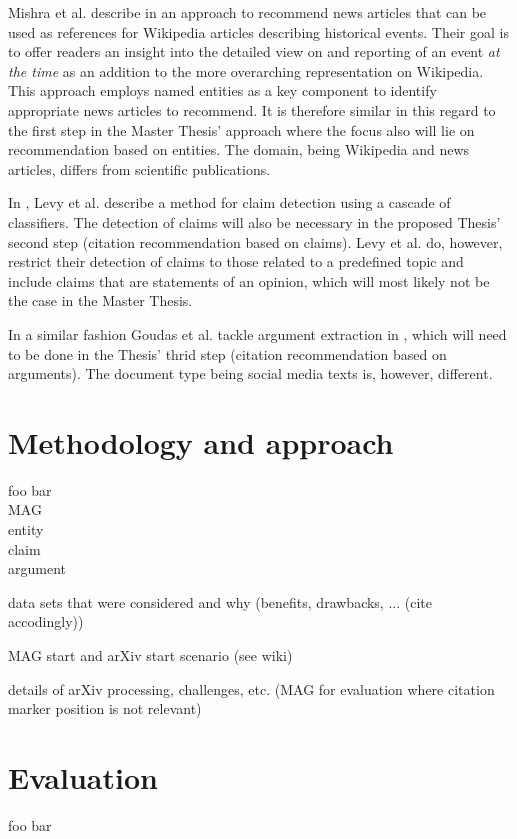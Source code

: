 \documentclass{proseminar}
\begin{document}
Mishra et al. describe in \cite{Mishra2016} an approach to recommend news articles that can be used as references for Wikipedia articles describing historical events. Their goal is to offer readers an insight into the detailed view on and reporting of an event \emph{at the time} as an addition to the more overarching representation on Wikipedia. This approach employs named entities as a key component to identify appropriate news articles to recommend. It is therefore similar in this regard to the first step in the Master Thesis' approach where the focus also will lie on recommendation based on entities. The domain, being Wikipedia and news articles, differs from scientific publications.

In \cite{Levy2014}, Levy et al. describe a method for claim detection using a cascade of classifiers. The detection of claims will also be necessary in the proposed Thesis' second step (citation recommendation based on claims). Levy et al. do, however, restrict their detection of claims to those related to a predefined topic and include claims that are statements of an opinion, which will most likely not be the case in the Master Thesis.

In a similar fashion Goudas et al. tackle argument extraction in \cite{Goudas2014}, which will need to be done in the Thesis' thrid step (citation recommendation based on arguments). The document type being social media texts is, however, different.

\section{Methodology and approach}\label{meth}
foo bar\\
MAG\cite{Paszcza2016}\cite{Herrmannova2016}\cite{Hug2017}\cite{Sinha2015}\\
entity\cite{Mishra2016}\\
claim\cite{Levy2014}\\
argument\cite{Goudas2014}

data sets that were considered and why (benefits, drawbacks, ... (cite accodingly))

MAG start and arXiv start scenario (see wiki)

details of arXiv processing, challenges, etc. (MAG for evaluation where citation marker position is not relevant)

\section{Evaluation}
foo bar
\end{document}
